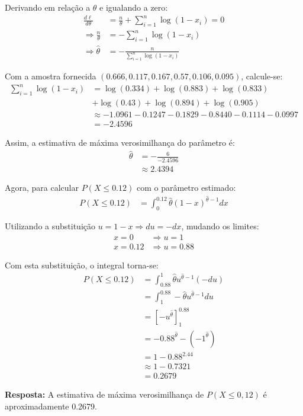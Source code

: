 \documentclass[a4paper,12pt]{article}
\begin{document}
\begin{enumerate}
\begin{mdframed}[backgroundcolor=gray!10, linewidth=0pt, innertopmargin=10pt, innerbottommargin=10pt]
    Derivando em relação a \( \theta \) e igualando a zero:
    \begin{align*}
    \frac{d\ell}{d\theta} &= \frac{n}{\theta} + \sum_{i=1}^{n} \log(1 - x_i) = 0 \\
    \Rightarrow \frac{n}{\theta} &= -\sum_{i=1}^{n} \log(1 - x_i) \\
    \Rightarrow \hat{\theta} &= -\frac{n}{\sum_{i=1}^{n} \log(1 - x_i)}
    \end{align*}

    Com a amostra fornecida \( (0.666, 0.117, 0.167, 0.57, 0.106, 0.095) \), calcule-se:
    \begin{align*}
    \sum_{i=1}^{n} \log(1 - x_i) &= \log(0.334) + \log(0.883) + \log(0.833) \\
    &+ \log(0.43) + \log(0.894) + \log(0.905) \\
    &\approx -1.0961 -0.1247 -0.1829 -0.8440 -0.1114 -0.0997 \\
    &= -2.4596
    \end{align*}

    Assim, a estimativa de máxima verosimilhança do parâmetro é:
    \begin{align*}
    \hat{\theta} &= -\frac{6}{-2.4596} \\
    &\approx 2.4394
    \end{align*}

    Agora, para calcular \( P(X \leq 0.12) \) com o parâmetro estimado:
    \begin{align*}
    P(X \leq 0.12) &= \int_0^{0.12} \hat{\theta}(1 - x)^{\hat{\theta} - 1} dx
    \end{align*}

    Utilizando a substituição \( u = 1 - x \Rightarrow du = -dx \), mudando os limites:
    \begin{align*}
    x = 0 &\Rightarrow u = 1 \\
    x = 0.12 &\Rightarrow u = 0.88
    \end{align*}

    Com esta substituição, o integral torna-se:
    \begin{align*}
    P(X \leq 0.12) &= \int_{0.88}^{1} \hat{\theta} u^{\hat{\theta} - 1} (-du) \\
    &= \int_{1}^{0.88} -\hat{\theta} u^{\hat{\theta} - 1} du \\
    &= \left[ -u^{\hat{\theta}} \right]_{1}^{0.88} \\
    &= -0.88^{\hat{\theta}} - (-1^{\hat{\theta}}) \\
    &= 1 - 0.88^{2.44} \\
    &\approx 1 - 0.7321 \\
    &= 0.2679
    \end{align*}

    \textbf{Resposta:} A estimativa de máxima verosimilhança de \( P(X \leq 0{,}12) \) é aproximadamente 0.2679.
    \end{mdframed}

\end{enumerate}
\end{document}
